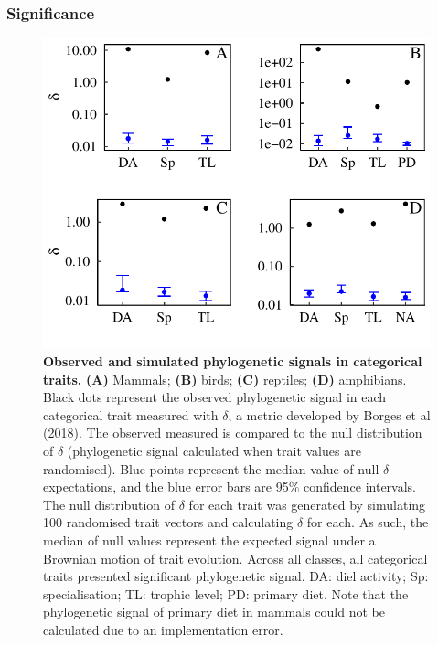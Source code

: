 \documentclass[11pt]{article}
\begin{document}
\subsubsection{Significance}
\begin{figure}[h!]
\centering
\includegraphics[scale=0.75]{figures/Physignal/Allclasses}
\caption[Observed and simulated phylogenetic signals in categorical traits]{\textbf{Observed and simulated phylogenetic signals in categorical traits.} \textbf{(A)} Mammals; \textbf{(B)} birds; \textbf{(C)} reptiles; \textbf{(D)} amphibians. Black dots represent the observed phylogenetic signal in each categorical trait measured with $\delta$, a metric developed by Borges et al (2018). The observed measured is compared to the null distribution of $\delta$ (phylogenetic signal calculated when trait values are randomised). Blue points represent the median value of null $\delta$ expectations, and the blue error bars are 95\% confidence intervals. The null distribution of $\delta$ for each trait was generated by simulating 100 randomised trait vectors and calculating $\delta$ for each. As such, the median of null values represent the expected signal under a Brownian motion of trait evolution. Across all classes, all categorical traits presented significant phylogenetic signal. DA: diel activity; Sp: specialisation; TL: trophic level; PD: primary diet. Note that the phylogenetic signal of primary diet in mammals could not be calculated due to an implementation error.}
\label{Catphysig}
\end{figure}
\end{document}
